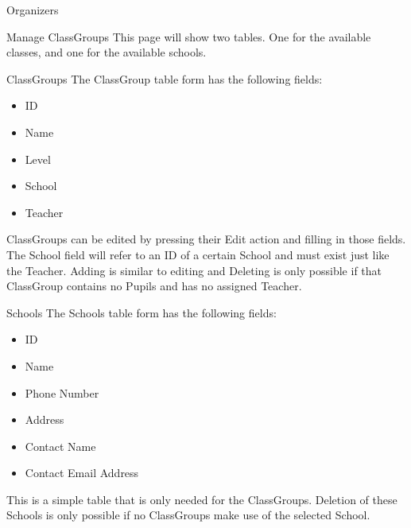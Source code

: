 \begin{section}{Organizers}
	\begin{subsection}{Manage ClassGroups}
		This page will show two tables. One for the available classes, and one for the
		available schools.
		\begin{subsubsection}{ClassGroups}
			The ClassGroup table form has the following fields:
			\begin{itemize}
				\item ID
				\item Name
				\item Level
				\item School
				\item Teacher
			\end{itemize}
			ClassGroups can be edited by pressing their Edit action and filling in those
			fields. The School field will refer to an ID of a certain School and must
			exist just like the Teacher. Adding is similar to editing and Deleting is
			only possible if that ClassGroup contains no Pupils and has no assigned
			Teacher.
		\end{subsubsection}
		
		\begin{subsubsection}{Schools}
			The Schools table form has the following fields:
			\begin{itemize}
				\item ID
				\item Name
				\item Phone Number
				\item Address
				\item Contact Name
				\item Contact Email Address
			\end{itemize}
			This is a simple table that is only needed for the ClassGroups. Deletion of
			these Schools is only possible if no ClassGroups make use of the selected
			School.
		\end{subsubsection}
	\end{subsection}
\end{section}
